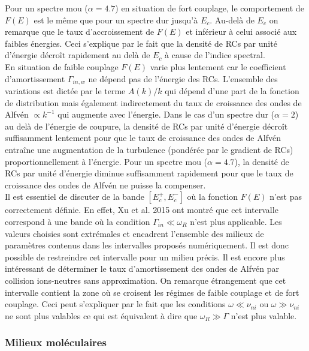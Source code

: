\documentclass[10pt,a4paper]{article}
\begin{document}
Pour un spectre mou ($\alpha = 4.7$) en situation de fort couplage, le comportement de $F(E)$ est le même que pour un spectre dur jusqu'à $E_c$. Au-delà de $E_c$ on remarque que le taux d'accroissement de $F(E)$ et inférieur à celui associé aux faibles énergies. Ceci s'explique par le fait que la densité de RCs par unité d'énergie décroît rapidement au delà de $E_c$ à cause de l'indice spectral. \\ 

En situation de faible couplage $F(E)$ varie plus lentement car le coefficient d'amortissement $\Gamma_{in,w}$ ne dépend pas de l'énergie des RCs. L'ensemble des variations est dictée par le terme $A(k)/k$ qui dépend d'une part de la fonction de distribution mais également indirectement du taux de croissance des ondes de Alfvén $\propto k^{-1}$ qui augmente avec l'énergie. Dans le cas d'un spectre dur ($\alpha = 2$) au delà de l'énergie de coupure, la densité de RCs par unité d'énergie décroît suffisamment lentement pour que le taux de croissance des ondes de Alfvén entraîne une augmentation de la turbulence (pondérée par le gradient de RCs) proportionnellement à l'énergie. Pour un spectre mou ($\alpha = 4.7$), la densité de RCs par unité d'énergie diminue suffisamment rapidement pour que le taux de croissance des ondes de Alfvén ne puisse la compenser. \\ 

Il est essentiel de discuter de la bande $[E^+_{c}, E^-_{c}]$  où la fonction $F(E)$ n'est pas correctement définie. En effet, Xu et al. 2015 ont montré que cet intervalle correspond à une bande où la condition $\Gamma_{in} \ll \omega_R$ n'est plus applicable. Les valeurs choisies sont extrémales et encadrent l'ensemble des milieux de paramètres contenus dans les intervalles proposés numériquement. Il est donc possible de restreindre cet intervalle pour un milieu précis. Il est encore plus intéressant de déterminer le taux d'amortissement des ondes de Alfvén par collision ions-neutres sans approximation. On remarque étrangement que cet intervalle contient la zone où se croisent les régimes de faible couplage et de fort couplage. Ceci peut s'expliquer par le fait que les conditions $\omega \ll \nu_{ni}$ ou $\omega \gg \nu_{ni}$ ne sont plus valables ce qui est équivalent à dire que $\omega_R \gg \Gamma$ n'est plus valable.  

\subsubsection*{Milieux moléculaires} 
\end{document}
